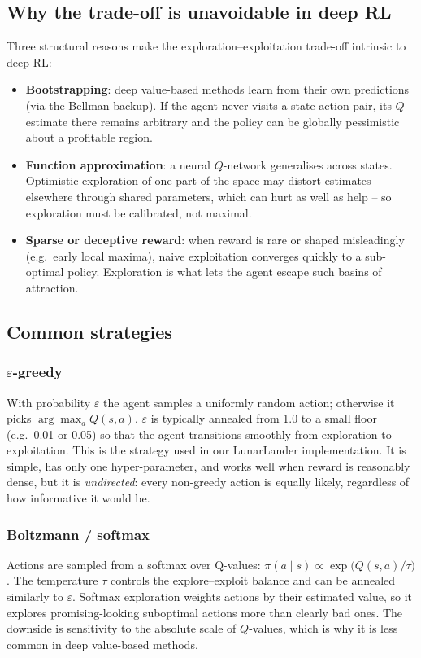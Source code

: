 \documentclass[11pt,a4paper]{article}
\begin{document}
\subsection{Why the trade-off is unavoidable in deep RL}
Three structural reasons make the exploration--exploitation trade-off
intrinsic to deep RL:
\begin{itemize}
  \item \textbf{Bootstrapping}: deep value-based methods learn from
    their own predictions (via the Bellman backup). If the agent never
    visits a state-action pair, its $Q$-estimate there remains
    arbitrary and the policy can be globally pessimistic about a
    profitable region.
  \item \textbf{Function approximation}: a neural $Q$-network
    generalises across states. Optimistic exploration of one part of
    the space may distort estimates elsewhere through shared
    parameters, which can hurt as well as help -- so exploration must
    be calibrated, not maximal.
  \item \textbf{Sparse or deceptive reward}: when reward is rare or
    shaped misleadingly (e.g.\ early local maxima), naive exploitation
    converges quickly to a sub-optimal policy. Exploration is what lets
    the agent escape such basins of attraction.
\end{itemize}

\subsection{Common strategies}
\subsubsection{$\varepsilon$-greedy}
With probability $\varepsilon$ the agent samples a uniformly random
action; otherwise it picks $\arg\max_a Q(s, a)$. $\varepsilon$ is
typically annealed from 1.0 to a small floor (e.g.\ 0.01 or 0.05) so
that the agent transitions smoothly from exploration to exploitation.
This is the strategy used in our LunarLander implementation. It is
simple, has only one hyper-parameter, and works well when reward is
reasonably dense, but it is \emph{undirected}: every non-greedy action
is equally likely, regardless of how informative it would be.

\subsubsection{Boltzmann / softmax}
Actions are sampled from a softmax over Q-values:
$\pi(a \mid s) \propto \exp\bigl(Q(s, a) / \tau\bigr)$. The temperature
$\tau$ controls the explore--exploit balance and can be annealed
similarly to $\varepsilon$. Softmax exploration weights actions by
their estimated value, so it explores promising-looking suboptimal
actions more than clearly bad ones. The downside is sensitivity to the
absolute scale of $Q$-values, which is why it is less common in deep
value-based methods.
\end{document}
